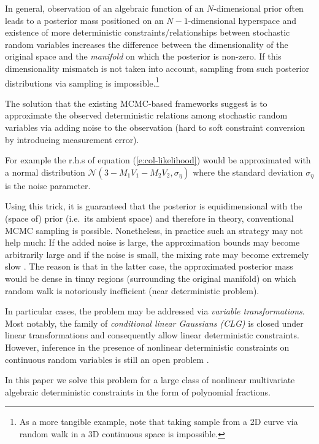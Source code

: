 \documentclass{article}
\begin{document}
In general, observation of an algebraic function of an $N$-dimensional prior often leads to a posterior mass positioned on an $N-1$-dimensional hyperspace and existence of more deterministic constraints/relationships between stochastic random variables increases the difference between the dimensionality of the original space and the \emph{manifold} on which the posterior is non-zero.  
If this dimensionality mismatch is not taken into account, sampling from such posterior distributions via sampling is impossible.\footnote{As a more tangible example, note that taking sample from a 2D curve via random walk in a 3D continuous space is impossible.}  

The solution that the existing MCMC-based frameworks suggest is to approximate the observed deterministic relations among  stochastic random variables via adding noise to the observation 
(hard to soft constraint conversion by introducing measurement error).

For example the r.h.s of equation (\ref{e:col-likelihood}) would be 
approximated with a normal distribution
{\footnotesize $\mathcal{N}(3 - M_1 V_1 - M_2 V_2, \sigma_\eta)$}  
where the standard deviation $\sigma_\eta$ is the noise parameter.

Using this trick, it is guaranteed that the posterior is equidimensional with the (space of) prior (i.e.\ its ambient space) and therefore in theory, conventional MCMC sampling is possible.
Nonetheless, in practice such an strategy may not help much:
If the added noise is large, 
the approximation bounds may become arbitrarily large
and if the noise is small, 
the mixing rate may become extremely slow \cite{chin1987bayesian}. 
The reason is that in the latter case, 
 the approximated posterior mass would be dense in tinny regions (surrounding the original manifold) on which random walk
is notoriously inefficient (near deterministic problem).  

In particular cases, the problem may be addressed via 
\emph{variable transformations}.
Most notably, 
the family of \emph{conditional linear Gaussians (CLG)} \cite{lauritzen2001stable}
is closed under linear transformations and consequently
allow linear deterministic constraints.
However, inference in the presence of nonlinear deterministic constraints on continuous random variables is still an open problem \cite{li2013dynamic}.
 
In this paper we solve this problem for a large class of nonlinear multivariate algebraic deterministic constraints in the form of polynomial fractions. 
\end{document}
